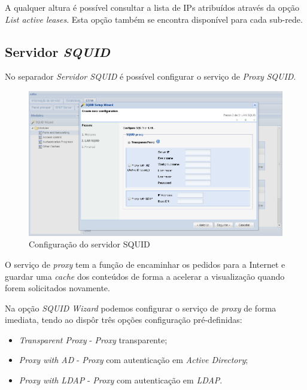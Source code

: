 A qualquer altura é possível consultar a lista de IPs atribuídos através da opção \textit{List active leases}. Esta opção também se encontra disponível para cada sub-rede.

\subsection{Servidor \textit{SQUID}}

No separador \textit{Servidor SQUID} é possível configurar o serviço de \textit{Proxy} \textit{SQUID}.

\begin{figure}[H]
    \begin{center}
    \includegraphics[scale=0.38]{screenshots/etfw/etfw_squid_wizard_01.png}
    \caption{Configuração do servidor SQUID}
    \label{fig:etfw_squid_wizard_01}
    \end{center}
\end{figure}

O serviço de \textit{proxy} tem a função de encaminhar os pedidos para a Internet e guardar uma \textit{cache} dos conteúdos de forma a acelerar a visualização quando forem solicitados novamente.

Na opção \textit{SQUID Wizard} podemos configurar o serviço de \textit{proxy} de forma imediata, tendo ao dispôr três opções configuração pré-definidas:

\begin{itemize}
    \item \textit{Transparent Proxy} - \textit{Proxy} transparente;
    \item \textit{Proxy with AD} - \textit{Proxy} com autenticação em \textit{Active Directory};
    \item \textit{Proxy with LDAP} - \textit{Proxy} com autenticação em \textit{LDAP}.
\end{itemize}

